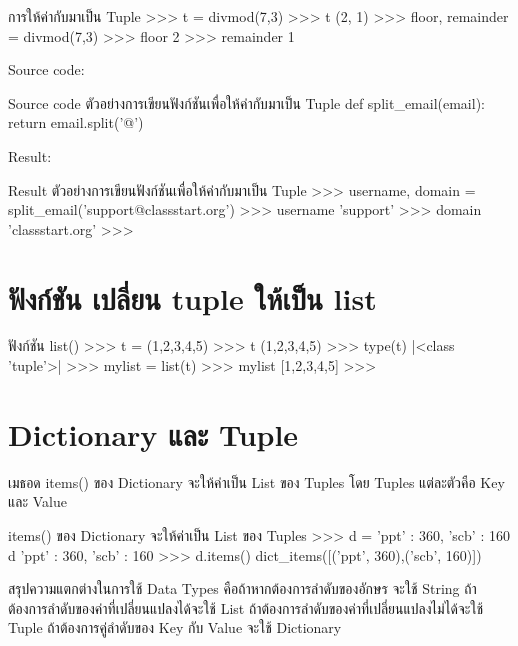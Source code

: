 \begin{codelist}{การให้ค่ากับมาเป็น Tuple}{}
>>> t = divmod(7,3)
>>> t
(2, 1)
>>> floor, remainder = divmod(7,3)
>>> floor
2
>>> remainder
1
\end{codelist}

Source code:
\begin{codelist}{Source code ตัวอย่างการเขียนฟังก์ชันเพื่อให้ค่ากับมาเป็น Tuple}{}
def split_email(email):
    return email.split('@')
\end{codelist}

Result:
\begin{codelist}{Result ตัวอย่างการเขียนฟังก์ชันเพื่อให้ค่ากับมาเป็น Tuple}{}
>>> username, domain = split_email('support@classstart.org')
>>> username
'support'
>>> domain
'classstart.org'
>>>
\end{codelist}

\section{ฟังก์ชัน  เปลี่ยน tuple ให้เป็น list}

\begin{codelist}{ฟังก์ชัน list()}{}
>>> t = (1,2,3,4,5)
>>> t
(1,2,3,4,5)
>>> type(t)
|<class \rq{}tuple\rq{}>|
>>> mylist = list(t)
>>> mylist
[1,2,3,4,5]
>>>
\end{codelist}


\section{Dictionary และ Tuple}

เมธอด items() ของ Dictionary จะให้ค่าเป็น List  ของ Tuples โดย Tuples แต่ละตัวคือ Key และ Value 

\begin{codelist}{items() ของ Dictionary จะให้ค่าเป็น List ของ Tuples}{}
>>> d = {'ppt' : 360, 'scb' : 160}
d
{'ppt' : 360, 'scb' : 160}
>>> d.items()
dict_items([('ppt', 360),('scb', 160)])
\end{codelist}


สรุปความแตกต่างในการใช้ Data Types คือถ้าหากต้องการลำดับของอักษร จะใช้ String ถ้าต้องการลำดับของค่าที่เปลี่ยนแปลงได้จะใช้ List ถ้าต้องการลำดับของค่าที่เปลี่ยนแปลงไม่ได้จะใช้ Tuple ถ้าต้องการคู่ลำดับของ Key กับ Value จะใช้ Dictionary

